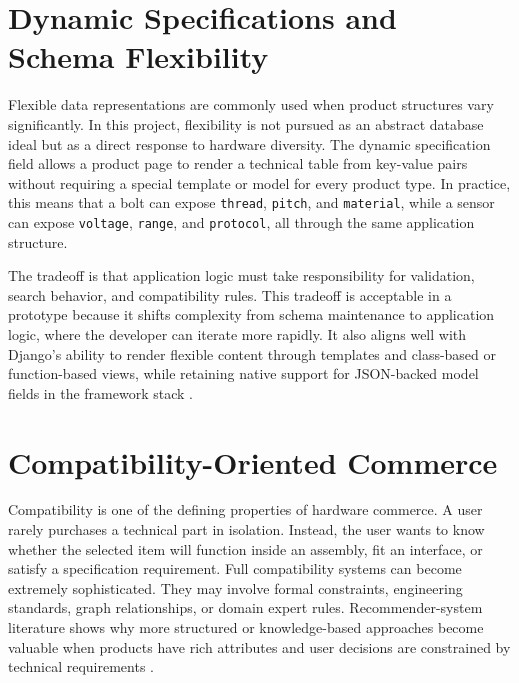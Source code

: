 \documentclass[12pt,letterpaper,oneside,openany]{book}
\begin{document}
\section{Dynamic Specifications and Schema Flexibility}

\begin{justifying}
Flexible data representations are commonly used when product structures vary
significantly. In this project, flexibility is not pursued as an abstract
database ideal but as a direct response to hardware diversity. The dynamic
specification field allows a product page to render a technical table from
key-value pairs without requiring a special template or model for every product
type. In practice, this means that a bolt can expose \texttt{thread},
\texttt{pitch}, and \texttt{material}, while a sensor can expose
\texttt{voltage}, \texttt{range}, and \texttt{protocol}, all through the same
application structure.
\end{justifying}

\begin{justifying}
The tradeoff is that application logic must take responsibility for validation,
search behavior, and compatibility rules. This tradeoff is acceptable in a
prototype because it shifts complexity from schema maintenance to application
logic, where the developer can iterate more rapidly. It also aligns well with
Django's ability to render flexible content through templates and class-based or
function-based views, while retaining native support for JSON-backed model
fields in the framework stack \cite{django-docs}.
\end{justifying}

\section{Compatibility-Oriented Commerce}

\begin{justifying}
Compatibility is one of the defining properties of hardware commerce. A user
rarely purchases a technical part in isolation. Instead, the user wants to know
whether the selected item will function inside an assembly, fit an interface,
or satisfy a specification requirement. Full compatibility systems can become
extremely sophisticated. They may involve formal constraints, engineering
standards, graph relationships, or domain expert rules. Recommender-system
literature shows why more structured or knowledge-based approaches become
valuable when products have rich attributes and user decisions are constrained
by technical requirements \cite{scholz-config,zhang-ai-rec}.
\end{justifying}
\end{document}
